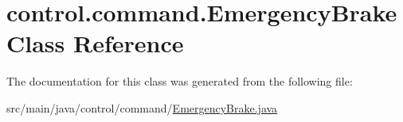 \hypertarget{classcontrol_1_1command_1_1_emergency_brake}{}\section{control.\+command.\+Emergency\+Brake Class Reference}
\label{classcontrol_1_1command_1_1_emergency_brake}


The documentation for this class was generated from the following file\+:\begin{DoxyCompactItemize}
\item 
src/main/java/control/command/\mbox{\hyperlink{_emergency_brake_8java}{Emergency\+Brake.\+java}}\end{DoxyCompactItemize}
